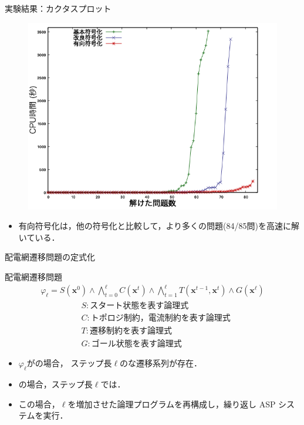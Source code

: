 \documentclass[dvipdfmx,11pt]{beamer}
\begin{document}
\begin{frame}{実験結果：カクタスプロット}
 \begin{figure}[h]
  \centering
  \includegraphics[scale=0.4]{fig/cactus.png}
 \end{figure}

\begin{itemize}
 \item 有向符号化は，他の符号化と比較して，より多くの問題(84/85問)を高速に解いている．
\end{itemize}\vfill
\end{frame}
\begin{frame}{配電網遷移問題の定式化} 
 \begin{alertblock}{配電網遷移問題}
  \begin{align*}
   \varphi_{\ell} = S(\boldsymbol{x}^0)  
   \land \bigwedge_{t=0}^{\ell} C(\boldsymbol{x}^t) 
   \land \bigwedge_{t=1}^{\ell} T(\boldsymbol{x}^{t-1}, \boldsymbol{x}^{t}) 
   \land G(\boldsymbol{x}^\ell)  
  \end{align*}
\begin{align*}
 &S: \textrm{スタート状態を表す論理式} \\
 &C: \textrm{トポロジ制約，電流制約を表す論理式} \\
 &T: \textrm{遷移制約を表す論理式} \\
 &G: \textrm{ゴール状態を表す論理式}
\end{align*}
 \end{alertblock}
 \begin{itemize}
  \item $\varphi_{\ell}$がの場合，
        ステップ長$\ell$のな遷移系列が存在．
  \item {}の場合，ステップ長$\ell$では．
  \item この場合，$\ell$を増加させた論理プログラムを再構成し，繰り返し ASP システムを実行．
\end{itemize}
\end{frame}
\end{document}
